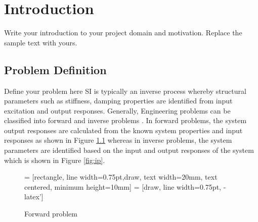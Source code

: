 \documentclass[MTech]{ugthesis}
\begin{document}

\chapter{Introduction}
\label{chap:intro}
Write your introduction to your project domain and motivation. Replace the sample text with yours.
\section{Problem Definition}
Define your problem here
 \ac{SI} is typically an inverse process whereby structural parameters such as stiffness, damping properties are identified from input excitation and output responses.
 Generally, Engineering problems can be classified into forward and inverse problems \citep{783214}. In forward problems, \citep{two}the system output responses are calculated from the known system properties and input responses as shown in Figure \ref{fig:fp} whereas in inverse problems, the system parameters are identified based on the input and output responses of the system which is shown in Figure \ref{fig:ip}. 
 \begin{figure}[htpb]
  \centering
     = [rectangle, line width=0.75pt,draw,  text width=20mm, text centered,  minimum height=10mm]
     = [draw, line width=0.75pt, -latex']
 \caption{Forward problem}
 \label{fig:fp}
 \end{figure}
\end{document}

